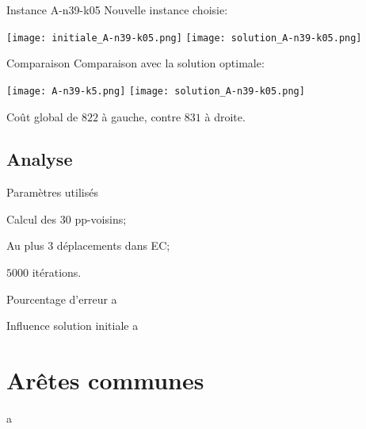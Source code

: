 \documentclass{beamer}
\begin{document}
\begin{frame}{Instance A-n39-k05}
Nouvelle instance choisie:
\begin{center}
\texttt{[image: initiale\_A-n39-k05.png]}
\texttt{[image: solution\_A-n39-k05.png]}
\end{center}

\end{frame}

\begin{frame}{Comparaison}
Comparaison avec la solution optimale:
\begin{center}
\texttt{[image: A-n39-k5.png]}
\texttt{[image: solution\_A-n39-k05.png]}
\end{center}
Coût global de $822$ à gauche, contre $831$ à droite.
\end{frame}

\subsection{Analyse}

\begin{frame}{Paramètres utilisés}
\begin{block}
\item Calcul des 30 pp-voisins;
\item Au plus 3 déplacements dans EC;
\item $5000$ itérations.
\end{block}
\end{frame}

\begin{frame}{Pourcentage d'erreur}
a
\end{frame}

\begin{frame}{Influence solution initiale}
a
\end{frame}

\section{Arêtes communes}

\begin{frame}
a
\end{frame}
\end{document}
